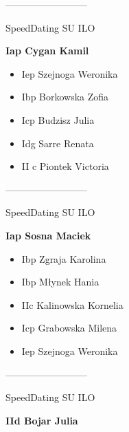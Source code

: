 \documentclass[a4paper,10pt]{article}
\begin{document}
\begin{multicols}{3}
\begin{minipage}[l]{\textwidth}
\begin{itemize}
    \end{itemize}



\end{minipage}



\begin{minipage}[l]{\textwidth}
--------------------------

  \footnotesize{SpeedDating SU ILO}

  \bfseries{Iap Cygan Kamil}

  \begin{itemize}
    \item Iep Szejnoga Weronika
    \item Ibp Borkowska Zofia
    \item Icp Budzisz Julia
    \item Idg Sarre Renata
    \item II c Piontek Victoria

    \end{itemize}



\end{minipage}



\begin{minipage}[l]{\textwidth}
--------------------------

  \footnotesize{SpeedDating SU ILO}

  \bfseries{Iap Sosna Maciek}

  \begin{itemize}
    \item Ibp Zgraja Karolina
    \item Ibp Młynek Hania
    \item IIc Kalinowska Kornelia
    \item Icp Grabowska Milena
    \item Iep Szejnoga Weronika

    \end{itemize}



\end{minipage}



\begin{minipage}[l]{\textwidth}
--------------------------

  \footnotesize{SpeedDating SU ILO}

  \bfseries{IId Bojar Julia}


\end{minipage}
\end{multicols}
\end{document}
